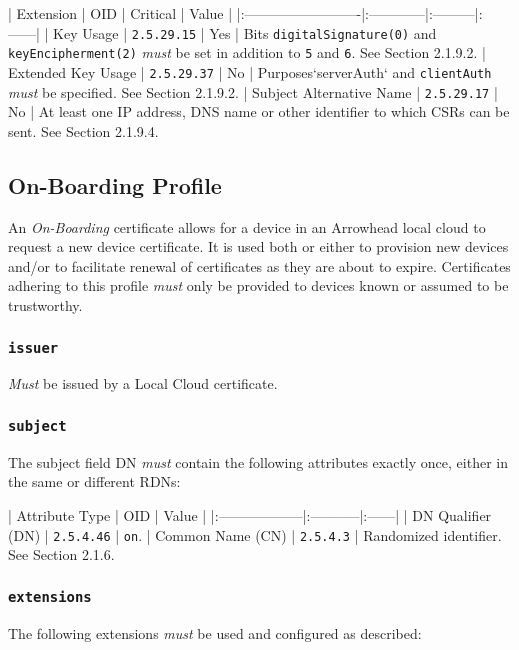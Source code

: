 | Extension                | OID         | Critical | Value |
|:-------------------------|:------------|:---------|:------|
| Key Usage                | \texttt{2.5.29.15} | Yes      | Bits \texttt{digitalSignature(0)} and \texttt{keyEncipherment(2)} \textit{must} be set in addition to \texttt{5} and \texttt{6}. See Section 2.1.9.2.
| Extended Key Usage       | \texttt{2.5.29.37} | No       | Purposes`serverAuth` and \texttt{clientAuth} \textit{must} be specified. See Section 2.1.9.2.
| Subject Alternative Name | \texttt{2.5.29.17} | No       | At least one IP address, DNS name or other identifier to which CSRs can be sent. See Section 2.1.9.4.

\subsection{On-Boarding Profile}

An \textit{On-Boarding} certificate allows for a device in an Arrowhead local cloud to request a new device certificate.
It is used both or either to provision new devices and/or to facilitate renewal of certificates as they are about to expire.
Certificates adhering to this profile \textit{must} only be provided to devices known or assumed to be trustworthy.

\subsubsection{\texttt{issuer}}

\textit{Must} be issued by a Local Cloud certificate.

\subsubsection{\texttt{subject}}

The subject field DN \textit{must} contain the following attributes exactly once, either in the same or different RDNs:

| Attribute Type    | OID        | Value |
|:------------------|:-----------|:------|
| DN Qualifier (DN) | \texttt{2.5.4.46} | \texttt{on}.
| Common Name (CN)  | \texttt{2.5.4.3}  | Randomized identifier. See Section 2.1.6.

\subsubsection{\texttt{extensions}}

The following extensions \textit{must} be used and configured as described:

